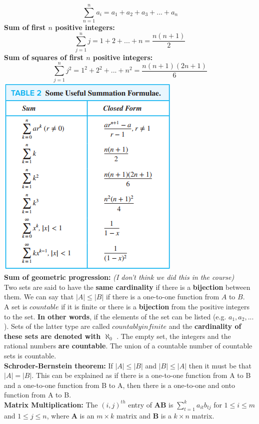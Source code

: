 \documentclass[12pt]{article}
\begin{document}
$$
\sum_{n=1}^{n} a_i = a_1 + a_2 + a_3 + ... + a_n
$$
\textbf{Sum of first $n$ positive integers:} 
$$
\sum_{j=1}^{n} j = 1 + 2 + ... + n = \frac{n(n +1)}{2}
$$
\textbf{Sum of squares of first $n$ positive integers:}
$$
\sum_{j=1}^{n} j^2 = 1^2 + 2^2 + ... + n^2 = \frac{n(n +1)(2n+1)}{6}
$$
\includegraphics[scale=0.8]{summation_formulae} \\
\textbf{Sum of geometric progression:}
\textit{(I don't think we did this in the course)}\\ 
\newpage
Two sets are said to have the \textbf{same cardinality} if there is a \textbf{bijection} between them. We can say that $|A| \leq |B|$ if there is a one-to-one function from $A$ to $B$. \\
A set is $countable$ if it is finite or there is a \textbf{bijection} from the positive integers to the set. \textbf{In other words}, if the elements of the set can be listed (e.g. $a_1, a_2, ...$). Sets of the latter type are called $countably infinite$ and the \textbf{cardinality of these sets are denoted with $\aleph_0$ }. The empty set, the integers and the rational numbers \textbf{are countable}. The union of a countable number of countable sets is countable. \\
\textbf{Schroder-Bernstein theorem:} If $|A| \leq |B|$ and $|B| \leq |A|$ then it must be that $|A| = |B|$. This can be explained as if there is a one-to-one function from A to B and a one-to-one function from B to A, then there is a one-to-one and onto function from A to B. \\
\textbf{Matrix Multiplication:} The $(i,j)^{th}$ entry of \textbf{AB} is $\sum_{t=1}^k a_{it}b_{tj}$ for $1 \leq i \leq m$ and $1 \leq j \leq n$, where \textbf{A} is an $m \times k$ matrix and \textbf{B} is a $k \times n$ matrix. \\
\end{document}
